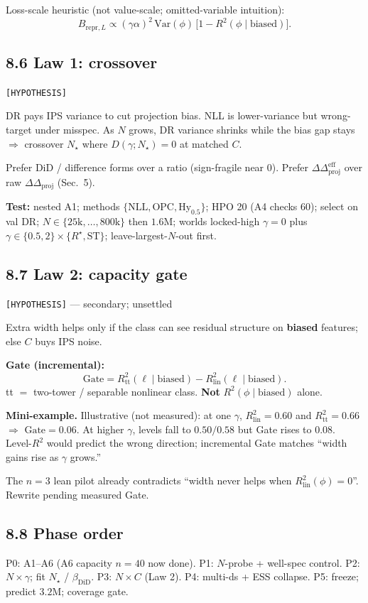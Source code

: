 \documentclass[11pt]{article}
\newcommand{\phonesub}[1]{\Needspace{6\baselineskip}\subsection*{#1}}
\newcommand{\stag}[1]{\texttt{[#1]}}
\newcommand{\Rstar}{R^{\star}}
\newcommand{\DDproj}{\Delta\Delta_{\mathrm{proj}}}
\newcommand{\DDprojeff}{\Delta\Delta_{\mathrm{proj}}^{\mathrm{eff}}}
\newcommand{\miniex}[1]{\par{\footnotesize\color{black!70}\textbf{Mini-example.} #1\par}}
\begin{document}
Loss-scale heuristic (not value-scale;
omitted-variable intuition):
\begin{equation*}
B_{\mathrm{repr},L}
  \propto (\gamma\alpha)^{2}\,\mathrm{Var}(\phi)\,
  \big[1-R^{2}(\phi\mid\mathrm{biased})\big].
\end{equation*}

\phonesub{8.6 Law 1: crossover}
\stag{HYPOTHESIS}

DR pays IPS variance to cut projection bias.
NLL is lower-variance but wrong-target under
misspec.  As $N$ grows, DR variance shrinks
while the bias gap stays $\Rightarrow$
crossover $N_{\star}$ where
$D(\gamma;N_{\star})=0$ at matched $C$.

Prefer DiD / difference forms over a ratio
(sign-fragile near 0).  Prefer
$\DDprojeff$ over raw $\DDproj$ (Sec.~5).

\textbf{Test:} nested A1; methods
$\{\mathrm{NLL},\mathrm{OPC},\mathrm{Hy}_{0.5}\}$;
HPO 20 (A4 checks 60); select on val DR;
$N\in\{25\mathrm{k},\ldots,800\mathrm{k}\}$ then
$1.6$M; worlds locked-high $\gamma{=}0$ plus
$\gamma\in\{0.5,2\}\times\{\Rstar,\mathrm{ST}\}$;
leave-largest-$N$-out first.

\phonesub{8.7 Law 2: capacity gate}
\stag{HYPOTHESIS} --- secondary; unsettled

Extra width helps only if the class can see
residual structure on \textbf{biased}
features; else $C$ buys IPS noise.

\textbf{Gate (incremental):}
\begin{equation*}
\mathrm{Gate}
  = R^{2}_{\mathrm{tt}}(\ell\mid\mathrm{biased})
  - R^{2}_{\mathrm{lin}}(\ell\mid\mathrm{biased}).
\end{equation*}
tt $=$ two-tower / separable nonlinear class.
\textbf{Not} $R^{2}(\phi\mid\mathrm{biased})$
alone.

\miniex{Illustrative (not measured): at one
$\gamma$, $R^{2}_{\mathrm{lin}}{=}0.60$ and
$R^{2}_{\mathrm{tt}}{=}0.66$ $\Rightarrow$
$\mathrm{Gate}{=}0.06$.  At higher $\gamma$,
levels fall to $0.50/0.58$ but Gate rises to
$0.08$.  Level-$R^{2}$ would predict the
wrong direction; incremental Gate matches
``width gains rise as $\gamma$ grows.''}

The $n{=}3$ lean pilot already contradicts
``width never helps when
$R^{2}_{\mathrm{lin}}(\phi){=}0$''.  Rewrite
pending measured Gate.

\phonesub{8.8 Phase order}
P0: A1--A6 (A6 capacity $n{=}40$ now done).
P1: $N$-probe + well-spec control.
P2: $N\times\gamma$; fit $N_{\star}$ /
$\beta_{\mathrm{DiD}}$.
P3: $N\times C$ (Law 2).
P4: multi-ds + ESS collapse.
P5: freeze; predict $3.2$M; coverage gate.
\end{document}
